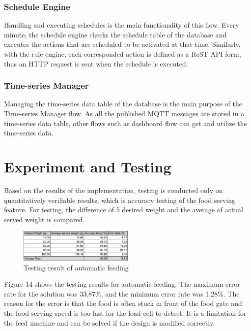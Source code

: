 ﻿\documentclass[conference]{IEEEtran}
\begin{document}
\subsubsection{Schedule Engine}
Handling and executing schedules is the main functionality of this flow.
Every minute, the schedule engine checks the schedule table of the database and executes the actions that are scheduled to be activated at that time.
Similarly, with the rule engine, each corresponded action is defined as a ReST API form, thus an HTTP request is sent when the schedule is executed.

\subsubsection{Time-series Manager}
Managing the time-series data table of the database is the main purpose of the Time-series Manager flow.
As all the published MQTT messages are stored in a time-series data table, other flows such as dashboard flow can get and utilize the time-series data.

\section{Experiment and Testing}
Based on the results of the implementation, testing is conducted only on quantitatively verifiable results, which is accuracy testing of the food serving feature.
For testing, the difference of 5 desired weight and the average of actual served weight is compared.

\begin{figure}[htbp]
\centerline{\includegraphics[width=0.5\textwidth]{./images/serve-accuracy.png}}
\caption{Testing result of automatic feeding}
\label{fig}
\end{figure}

Figure 14 shows the testing results for automatic feeding.
The maximum error rate for the solution was 33.87\%, and the minimum error rate was 1.28\%.
The reason for the error is that the food is often stuck in front of the food gate and the food serving speed is too fast for the load cell to detect.
It is a limitation for the feed machine and can be solved if the design is modified correctly.
\end{document}

